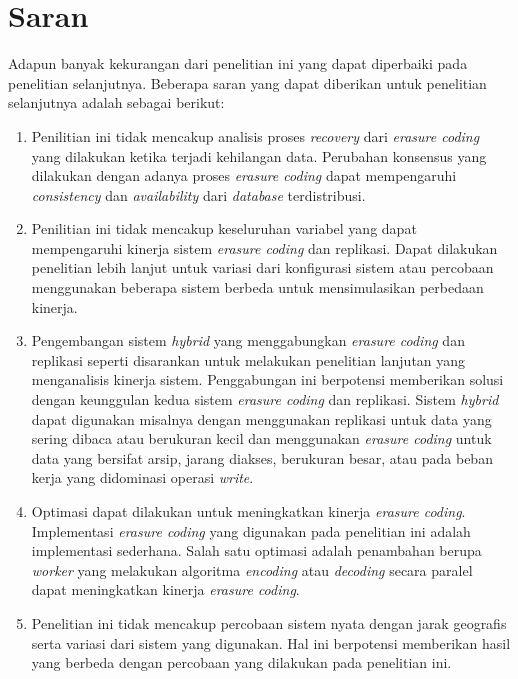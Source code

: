 \section{Saran}
\label{sec:saran}

Adapun banyak kekurangan dari penelitian ini yang dapat diperbaiki pada penelitian selanjutnya. Beberapa saran yang dapat diberikan untuk penelitian selanjutnya adalah sebagai berikut:

\begin{enumerate}
  \item Penilitian ini tidak mencakup analisis proses \textit{recovery} dari \textit{erasure coding} yang dilakukan ketika terjadi kehilangan data. Perubahan konsensus yang dilakukan dengan adanya proses \textit{erasure coding} dapat mempengaruhi \textit{consistency} dan \textit{availability} dari \textit{database} terdistribusi.
  \item Penilitian ini tidak mencakup keseluruhan variabel yang dapat mempengaruhi kinerja sistem \textit{erasure coding} dan replikasi. Dapat dilakukan penelitian lebih lanjut untuk variasi dari konfigurasi sistem atau percobaan menggunakan beberapa sistem berbeda untuk mensimulasikan perbedaan kinerja. 
  \item Pengembangan sistem \textit{hybrid} yang menggabungkan \textit{erasure coding} dan replikasi seperti disarankan untuk melakukan penelitian lanjutan yang menganalisis kinerja sistem. Penggabungan ini berpotensi memberikan solusi dengan keunggulan kedua sistem \textit{erasure coding} dan replikasi. Sistem \textit{hybrid} dapat digunakan misalnya dengan menggunakan replikasi untuk data yang sering dibaca atau berukuran kecil dan menggunakan \textit{erasure coding} untuk data yang bersifat arsip, jarang diakses, berukuran besar, atau pada beban kerja yang didominasi operasi \textit{write}.
  \item Optimasi dapat dilakukan untuk meningkatkan kinerja \textit{erasure coding}. Implementasi \textit{erasure coding} yang digunakan pada penelitian ini adalah implementasi sederhana. Salah satu optimasi adalah penambahan berupa \textit{worker} yang melakukan algoritma \textit{encoding} atau \textit{decoding} secara paralel dapat meningkatkan kinerja \textit{erasure coding}.
  \item Penelitian ini tidak mencakup percobaan sistem nyata dengan jarak geografis serta variasi dari sistem yang digunakan. Hal ini berpotensi memberikan hasil yang berbeda dengan percobaan yang dilakukan pada penelitian ini.
\end{enumerate}